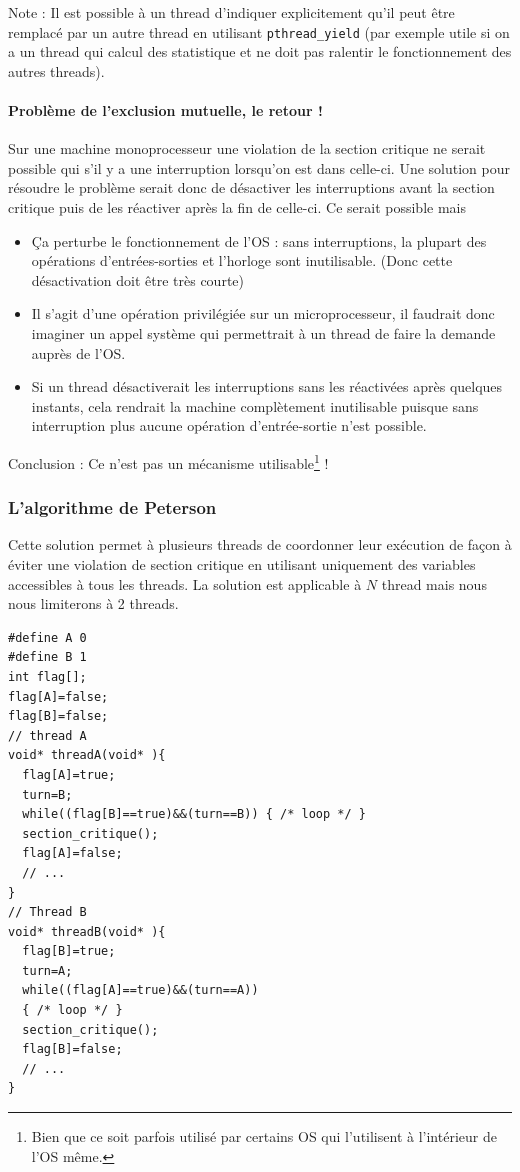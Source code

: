 Note : Il est possible à un thread d'indiquer explicitement  qu'il peut être remplacé par un autre thread en utilisant \texttt{pthread\_yield} (par exemple utile si on a un thread qui calcul des statistique et ne doit pas ralentir le fonctionnement des autres threads).

\paragraph{Problème de l'exclusion mutuelle, le retour !} Sur une machine monoprocesseur une violation de la section critique ne serait possible qui s'il y a une interruption lorsqu'on est dans celle-ci.
Une solution pour résoudre le problème serait donc de désactiver les interruptions avant la section critique puis de les réactiver après la fin de celle-ci.
Ce serait possible mais
\begin{itemize}
  \item Ça perturbe le fonctionnement de l'OS : sans interruptions, la plupart des opérations d'entrées-sorties et l'horloge sont inutilisable.
    (Donc cette désactivation doit être très courte)
  \item Il s'agit d'une opération privilégiée sur un microprocesseur, il faudrait donc imaginer un appel système qui permettrait à un thread de faire la demande auprès de l'OS.
  \item Si un thread désactiverait les interruptions sans les réactivées après quelques instants, cela rendrait la machine complètement inutilisable puisque sans interruption plus aucune opération d'entrée-sortie n'est possible.
\end{itemize}
Conclusion : Ce n'est pas un mécanisme utilisable\footnote{Bien que ce soit parfois utilisé par certains OS qui l'utilisent à l'intérieur de l'OS même.} !

\subsubsection*{L'algorithme de Peterson}
Cette solution permet à plusieurs threads de coordonner leur exécution de façon à éviter une violation de section critique en utilisant uniquement des variables accessibles à tous les threads.
La solution est applicable à $N$ thread mais nous nous limiterons à 2 threads.

\begin{lstlisting}
#define A 0
#define B 1
int flag[];
flag[A]=false;
flag[B]=false;
// thread A
void* threadA(void* ){
  flag[A]=true;
  turn=B;
  while((flag[B]==true)&&(turn==B)) { /* loop */ }
  section_critique();
  flag[A]=false;
  // ...
}
// Thread B
void* threadB(void* ){
  flag[B]=true;
  turn=A;
  while((flag[A]==true)&&(turn==A))
  { /* loop */ }
  section_critique();
  flag[B]=false;
  // ...
}
\end{lstlisting}

